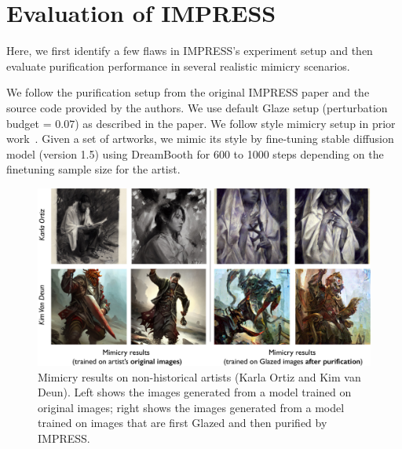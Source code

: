 \secspace
\section{Evaluation of IMPRESS}
\label{sec:issues}

Here, we first identify a few flaws in IMPRESS's experiment setup 
and then evaluate purification performance 
in several realistic mimicry scenarios. 

 We follow the purification setup from the original IMPRESS paper and the source
code provided by the authors. We use default 
Glaze setup (perturbation budget = $0.07$) as described in the paper. 
We follow style mimicry setup in prior 
work~\cite{shan2023glaze}. Given a set of artworks, we mimic its style by
fine-tuning stable diffusion model (version 1.5) using DreamBooth 
for 600 to 1000 steps depending on the finetuning sample size for the artist.

\begin{figure}
  \centering
  \includegraphics[width=0.99\linewidth]{nonhistorical.pdf}
  \vspace{-0.1in}
  \caption{Mimicry results on non-historical artists (Karla Ortiz and Kim van Deun). Left shows the images generated from a model trained on original images; right shows the images generated from a model trained on images that are first Glazed and then purified by IMPRESS. }
  \label{fig:non-historical}
  \vspace{-0.in}
\end{figure}

